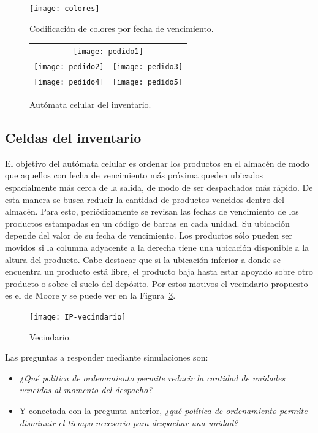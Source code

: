 \documentclass[10pt]{article}
\begin{document}
 \begin{figure}[h] 
 	\centering 
 	\texttt{[image: colores]} 
 	\caption{Codificación de colores por fecha de vencimiento.} 
 	\label{fig:AC-colores} 
 \end{figure}
 
 \begin{figure}[h] 
 \centering
 
 	\begin{tabular}{cc}
 		\multicolumn{2}{c}{\texttt{[image: pedido1]}}\\[5mm]
 		\texttt{[image: pedido2]} &
 		\texttt{[image: pedido3]} \\[5mm]
 		\texttt{[image: pedido4]} &
 		\texttt{[image: pedido5]} \\
 	\end{tabular}
 	
 	\caption{Autómata celular del inventario.} 
 	\label{fig:AC-inventario} 
 \end{figure}
 \FloatBarrier
 
\subsection{Celdas del inventario}

El objetivo del autómata celular es ordenar los productos en el almacén de modo que aquellos con fecha de vencimiento más próxima queden ubicados espacialmente más cerca de la salida, de modo de ser despachados más rápido. De esta manera se busca reducir la cantidad de productos vencidos dentro del almacén. Para esto, periódicamente se revisan las fechas de vencimiento de los productos estampadas en un código de barras en cada unidad. Su ubicación depende del valor de su fecha de vencimiento. Los productos sólo pueden ser movidos si la columna adyacente a la derecha tiene una ubicación disponible a la altura del producto.
Cabe destacar que si la ubicación inferior a donde se encuentra un producto está libre, el producto baja hasta estar apoyado sobre otro producto o sobre el suelo del depósito.
Por estos motivos el vecindario propuesto es el de Moore y se puede ver en la Figura~\ref{fig:AC-vecindario}.

\begin{figure}[h] 
  \centering 
  \texttt{[image: IP-vecindario]} 
  \caption{Vecindario.} 
  \label{fig:AC-vecindario} 
\end{figure}
\FloatBarrier

Las preguntas a responder mediante simulaciones son:
\begin{itemize}
\item \textit{¿Qué política de ordenamiento permite reducir la cantidad de unidades vencidas al momento del despacho?}
\item Y conectada con la pregunta anterior, \textit{¿qué política de ordenamiento permite disminuir el tiempo necesario para despachar una unidad?}
\end{itemize}
\end{document}

